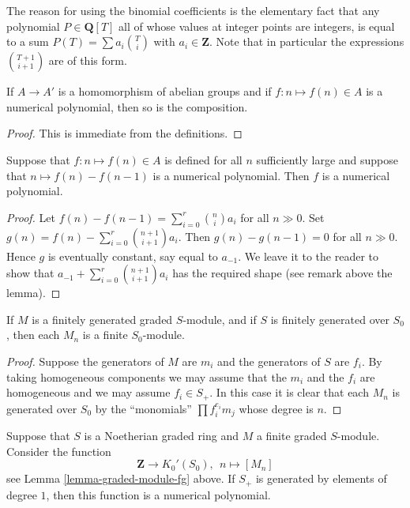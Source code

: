 \noindent
The reason for using the binomial coefficients is the
elementary fact that any polynomial $P \in \mathbf{Q}[T]$
all of whose values at integer points are integers, is
equal to a sum $P(T) = \sum a_i{T \choose i}$ with
$a_i \in \mathbf{Z}$. Note that in particular the 
expressions ${T+1 \choose i + 1}$ are of this form.

\begin{lemma}
\label{lemma-numerical-polynomial-functorial}
If $A \to A'$ is a homomorphism of abelian groups and if
$f : n \mapsto f(n) \in A$ is a numerical polynomial,
then so is the composition.
\end{lemma}

\begin{proof}
This is immediate from the definitions.
\end{proof}

\begin{lemma}
\label{lemma-numerical-polynomial}
Suppose that $f: n \mapsto f(n) \in A$
is defined for all $n$ sufficiently large
and suppose that $n \mapsto f(n) - f(n-1)$
is a numerical polynomial. Then $f$ is a
numerical polynomial.
\end{lemma}

\begin{proof}
Let $f(n) - f(n-1) = \sum\nolimits_{i=0}^r {n \choose i}a_i$
for all $n \gg 0$. Set
$g(n) = f(n) - \sum\nolimits_{i=0}^r {n+1 \choose i+1}a_i$.
Then $g(n) - g(n-1) = 0$ for all $n \gg 0$. Hence $g$ is
eventually constant, say equal to $a_{-1}$. We leave it
to the reader to show that
$a_{-1} + \sum\nolimits_{i=0}^r {n+1 \choose i+1}a_i$
has the required shape (see remark above the lemma).
\end{proof}

\begin{lemma}
\label{lemma-graded-module-fg}
If $M$ is a finitely generated graded $S$-module,
and if $S$ is finitely generated over $S_0$, then
each $M_n$ is a finite $S_0$-module.
\end{lemma}

\begin{proof}
Suppose the generators of $M$ are $m_i$ and the generators
of $S$ are $f_i$. By taking homogeneous components we may
assume that the $m_i$ and the $f_i$ are homogeneous
and we may assume $f_i \in S_{+}$. In this case it is
clear that each $M_n$ is generated over $S_0$
by the ``monomials'' $\prod f_i^{e_i} m_j$ whose
degree is $n$.
\end{proof}

\begin{proposition}
\label{proposition-graded-hilbert-polynomial}
Suppose that $S$ is a Noetherian graded ring
and $M$ a finite graded $S$-module. Consider the
function
$$
\mathbf{Z} \longrightarrow K_0'(S_0),\ \ 
n \longmapsto [M_n]
$$
see Lemma \ref{lemma-graded-module-fg} above.
If $S_{+}$ is generated by elements of degree $1$,
then this function is a numerical polynomial.
\end{proposition}

